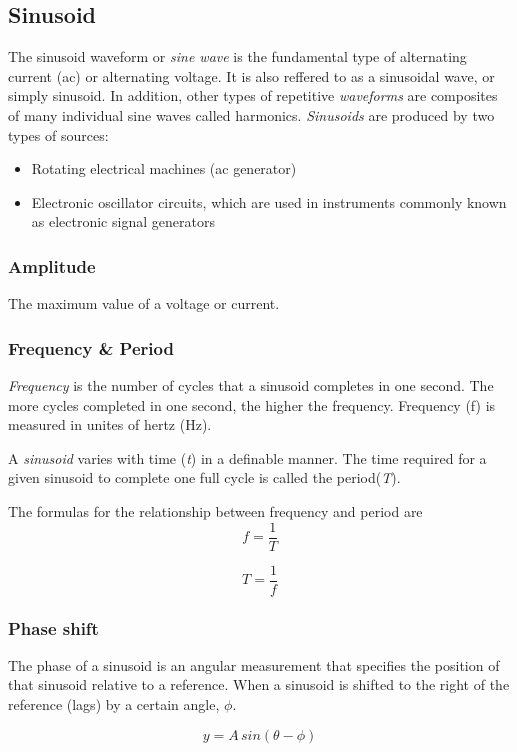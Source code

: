\subsection{Sinusoid}
The sinusoid waveform or \textit{sine wave} is the fundamental type of alternating current (ac) or alternating voltage. It is also reffered to as a sinusoidal wave, or simply sinusoid. In addition, other types of repetitive \textit{waveforms} are composites of many individual sine waves called harmonics.
\newline \textit{Sinusoids} are produced by two types of sources: \begin{itemize}
    \item Rotating electrical machines (ac generator)
    \item Electronic oscillator circuits, which are used in instruments commonly known as electronic signal generators
\end{itemize} 
\subsubsection{Amplitude}
The maximum value of a voltage or current.

\subsubsection{Frequency \& Period}
\textit{Frequency} is the number of cycles that a sinusoid completes in one second. The more cycles completed in one second, the higher the frequency. Frequency (f) is measured in unites of hertz (Hz).
\newline 

A \textit{sinusoid} varies with time (\textit{t}) in a definable manner. The time required for a given sinusoid to complete one full cycle is called the period(\textit{T}). 

The formulas for the relationship between frequency and period are
\[f = \frac{1}{T}\] 

\[T = \frac{1}{f}\]


\subsubsection{Phase shift}
The phase of a sinusoid is an angular measurement that specifies the position of that sinusoid relative to a reference. When a sinusoid is shifted to the right of the reference (lags) by a certain angle, \textbf{$\phi$}. 

\[y = A\, sin(\theta-\phi)\] 

